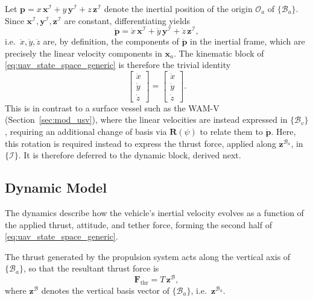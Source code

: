 Let $\mathbf{p} = x\,\mathbf{x}^{\mathcal{I}} + y\,\mathbf{y}^{\mathcal{I}} + z\,\mathbf{z}^{\mathcal{I}}$ denote the inertial position of the origin $\mathcal{O}_a$ of $\{\mathcal{B}_a\}$. Since $\mathbf{x}^{\mathcal{I}}, \mathbf{y}^{\mathcal{I}}, \mathbf{z}^{\mathcal{I}}$ are constant, differentiating yields
\begin{equation}
    \label{eq:uav_pdot_inertial_def}
    \dot{\mathbf{p}} = \dot{x}\,\mathbf{x}^{\mathcal{I}} + \dot{y}\,\mathbf{y}^{\mathcal{I}} + \dot{z}\,\mathbf{z}^{\mathcal{I}},
\end{equation}
i.e.\ $\dot{x}, \dot{y}, \dot{z}$ are, by definition, the components of $\dot{\mathbf{p}}$ in the inertial frame, which are precisely the linear velocity components in $\mathbf{x}_a$. The kinematic block of \eqref{eq:uav_state_space_generic} is therefore the trivial identity
\begin{equation}
    \label{eq:uav_kinematics}
    \begin{bmatrix} \dot{x} \\ \dot{y} \\ \dot{z} \end{bmatrix} = \begin{bmatrix} \dot{x} \\ \dot{y} \\ \dot{z} \end{bmatrix}.
\end{equation}
This is in contrast to a surface vessel such as the WAM-V (Section~\ref{sec:mod_usv}), where the linear velocities are instead expressed in $\{\mathcal{B}_v\}$, requiring an additional change of basis via $\mathbf{R}(\psi)$ to relate them to $\dot{\mathbf p}$. Here, this rotation is required instead to express the thrust force, applied along $\mathbf{z}^{\mathcal{B}_a}$, in $\{\mathcal{I}\}$. It is therefore deferred to the dynamic block, derived next.

\subsection{Dynamic Model}
\label{subsec:mod_uav_dynamics}
The dynamics describe how the vehicle's inertial velocity evolves as a function of the applied thrust, attitude, and tether force, forming the second half of \eqref{eq:uav_state_space_generic}.

The thrust generated by the propulsion system acts along the vertical axis of $\{\mathcal{B}_a\}$, so that the resultant thrust force is
\begin{equation}
    \mathbf{F}_{\mathrm{thr}} = T\,\mathbf{z}^{\mathcal{B}},
    \label{eq:uav_thrust_body}
\end{equation}
where $\mathbf{z}^{\mathcal{B}}$ denotes the vertical basis vector of $\{\mathcal{B}_a\}$, i.e.\ $\mathbf{z}^{\mathcal{B}_a}$.

